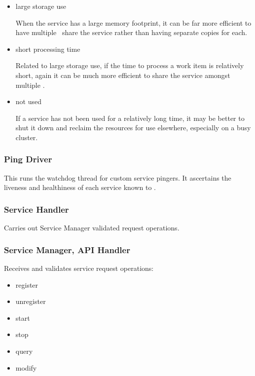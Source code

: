 \begin{itemize}
\begin{itemize}
      \item large storage use
      
      When the service has a large memory footprint, it can be far more
      efficient to have multiple \varJobs~share the service rather than
      having separate copies for each.
      
      \item short processing time
      
      Related to large storage use, if the time to process a work item is
      relatively short, again it can be much more efficient to share the
      service amongst multiple \varJobs.
      
      \item not used
      
      If a service has not been used for a relatively long time, it may be 
      better to shut it down and reclaim the resources for use elsewhere, 
      especially on a busy cluster.
            
    \end{itemize}
    
    \subsubsection{Ping Driver} 
    
    This runs the watchdog thread for custom service pingers.
    It ascertains the liveness and healthiness of each service
    known to \varDUCC.
    
    \subsubsection{Service Handler} 
    
    Carries out Service Manager validated request operations.
            
    \subsubsection{Service Manager, API Handler} 
    
    Receives and validates service request operations:
    
    \begin{itemize}
      \item register
      \item unregister
      \item start
      \item stop
      \item query
      \item modify
    \end{itemize}
    

\end{itemize}
